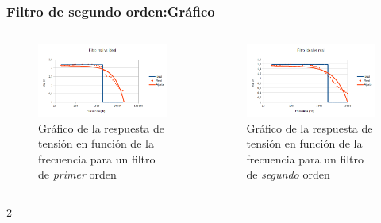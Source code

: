 \begin{frame}
\frametitle{Filtro de segundo orden:Gráfico}
\begin{columns}[t]
		\begin{figure}[H]
			\centering
			\includegraphics[scale=0.3]{Graf}
			\caption{Gráfico de la respuesta de tensión en función de la frecuencia para un filtro de \emph{primer} orden}	
		\end{figure}
		\begin{figure}[H]
			\centering
			\includegraphics[scale=0.3]{Graf2do}
			\caption{Gráfico de la respuesta de tensión en función de la frecuencia para un filtro de \emph{segundo} orden}	
		\end{figure}
	\end{columns}
2\end{frame}